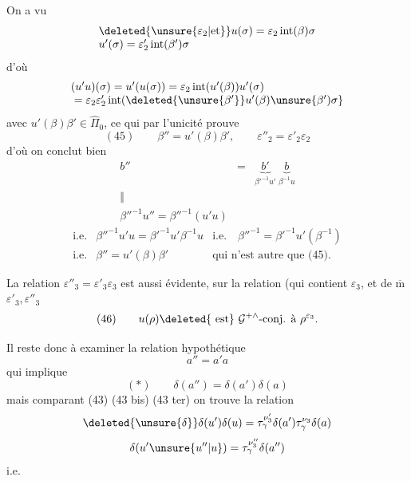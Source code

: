

On a vu
\[
\begin{array}{l}
\deleted{\unsure{\varepsilon_2|\text{et}}}u(\sigma)
 =\varepsilon_2\operatorname{int}(\beta)\sigma\\
u'(\sigma)=\varepsilon'_2\operatorname{int}(\beta')\sigma
\end{array}
\]
d'où
\[
\begin{array}{l}
(u'u)(\sigma)=u'(u(\sigma))
 =\varepsilon_2\operatorname{int}(u'(\beta))u'(\sigma)\\
\hfill{}=\varepsilon_2\varepsilon'_2
 \operatorname{int}(\deleted{\unsure{\beta'}}u'(\beta)\unsure{\beta')\sigma}
\end{array}
\]
avec \(u'(\beta)\beta'\in\widehat{\Pi}_0\), ce qui par l'unicité prouve
\[
(45)\qquad
\beta''=u'(\beta)\beta',\qquad
\varepsilon''_2=\varepsilon'_2\varepsilon_2
\]
d'où on conclut bien
\[
\begin{array}{ccc}
b''&=&\underbrace{b'}_{\beta'^{-1}u'}\ \underbrace{b}_{\beta^{-1}u}\\
\Vert&&\\
\beta''^{-1}u''=\beta''^{-1}(u'u)&&
\end{array}
\]
\[
\begin{array}{lll}
\text{i.e.}&\beta''^{-1}u'u=\beta'^{-1}u'\beta^{-1}u
 &\text{i.e.}\quad\beta''^{-1}=\beta'^{-1}u'(\beta^{-1})\\
\text{i.e.}&\beta''=u'(\beta)\beta'
 &\text{qui n'est autre que (45).}
\end{array}
\]

La relation \(\varepsilon''_3=\varepsilon'_3\varepsilon_3\) est aussi
évidente,  sur la relation (qui contient \(\varepsilon_3\),
et de \(\overline{\mathrm m}\) \(\varepsilon'_3,\varepsilon''_3\)
\[
(46)\qquad
u(\rho)\deleted{\text{ est}}\ \mathcal{G}^{+\wedge}\text{-conj. à }\rho^{\varepsilon_3}.
\]

Il reste donc à examiner la relation hypothétique
\[
a''=a'a
\]
qui  implique
\[
(*)\qquad\delta(a'')=\delta(a')\delta(a)
\]
mais comparant (43) (43 bis) (43 ter) on trouve la relation
\[
\deleted{\unsure{\delta}}\delta(u')\delta(u)
 =\tau_\gamma^{\nu'_3}\delta(a')\tau_\gamma^{\nu_3}\delta(a)
\]
\[
\delta(u'\unsure{u''|u})=\tau_\gamma^{\nu''_3}\delta(a'')
\]
\hfill i.e.

